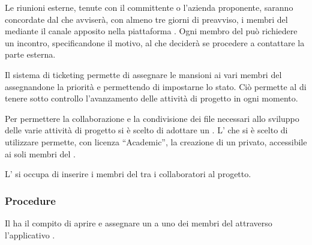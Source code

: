 \documentclass[a4paper, titlepage]{article}
\begin{document}
Le riunioni esterne, tenute con il committente o l'azienda proponente, saranno concordate dal  che avviserà, con almeno tre giorni di preavviso, i membri del  mediante il canale apposito nella piattaforma . Ogni membro del  può richiedere un incontro, specificandone il motivo, al  che deciderà se procedere a contattare la parte esterna.

Il sistema di ticketing permette di assegnare le mansioni ai vari membri del  assegnandone la priorità e permettendo di impostarne lo stato. Ciò permette al  di tenere sotto controllo l'avanzamento delle attività di progetto in ogni momento.

Per permettere la collaborazione e la condivisione dei file necessari allo sviluppo delle varie attività di progetto si è scelto di adottare un . L' che si è scelto di utilizzare permette, con licenza ``Academic'', la creazione di un  privato, accessibile ai soli membri del .

L' si occupa di inserire i membri del  tra i collaboratori al progetto.

\subsubsection{Procedure}

Il  ha il compito di aprire e assegnare un  a uno dei membri del  attraverso l'applicativo .
\end{document}
